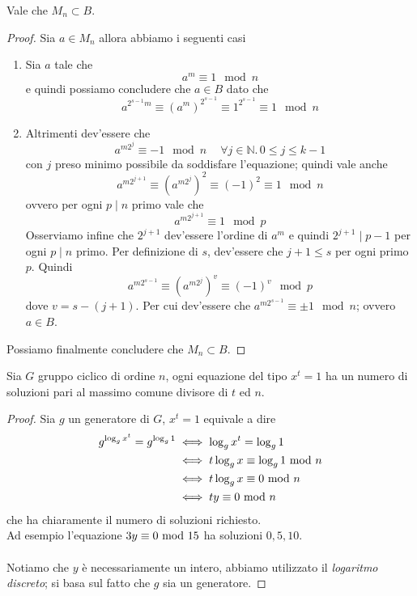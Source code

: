 \begin{lemma}
	Vale che $M_n\subset B$.
\end{lemma}
\begin{proof}
	Sia $a \in M_n$ allora abbiamo i seguenti casi
	\begin{enumerate}
		\item Sia $a$ tale che 
		\begin{equation*}
			a^m \equiv 1 \mod n 
		\end{equation*}
		e quindi possiamo concludere che $a \in B$ dato che 
		\begin{equation*}
			a^{2^{s-1}m} \equiv (a^m)^{2^{s-1}} \equiv 1^{2^{s-1}} \equiv 1 \mod n
		\end{equation*}
		\item Altrimenti dev'essere che
		\begin{equation*}
			a^{m2^{j}} \equiv -1 \mod n \quad\ \forall j \in \mathbb{N}.\, 0 \le j \le k-1
		\end{equation*} 
		con $j$ preso minimo possibile da soddisfare l'equazione; quindi vale anche
		\begin{equation*}
			a^{m2^{j+1}} \equiv (a^{m2^j})^2 \equiv (-1)^2 \equiv 1 \mod n
		\end{equation*}
		ovvero per ogni $p \mid n$ primo vale che 
		\begin{equation*}
			a^{m2^{j+1}} \equiv 1 \mod p
		\end{equation*}
		Osserviamo infine che $2^{j+1}$ dev'essere l'ordine di $a^m$ e quindi $2^{j+1} \mid p-1$ 
		per ogni $p \mid n$ primo. Per definizione di $s$, dev'essere che $j+1 \le s$ per ogni 
		primo $p$. Quindi
		\begin{equation*}
			a^{m2^{s-1}} \equiv (a^{m2^{j}})^v \equiv (-1)^v \mod p
		\end{equation*}
		dove $v = s - (j+1)$. Per cui dev'essere che $a^{m2^{s-1}} \equiv \pm 1 \mod n$; ovvero 
		$a \in B$.
	\end{enumerate}
	Possiamo finalmente concludere che $M_n \subset B$.
\end{proof}
\begin{lemma}
	Sia $G$ gruppo ciclico di ordine $n$, ogni equazione del tipo $x^t=1$ ha un numero di soluzioni pari al massimo comune divisore di $t$ ed $n$.
\end{lemma}
\begin{proof}
	Sia $g$ un generatore di $G$, $x^t=1$ equivale a dire 
	\begin{align*}
	g^{\log_gx^t}=g^{\log_g1}
	&\iff\log_gx^t=\log_g1\\
	&\iff t\log_gx\equiv\log_g1 \ \mathrm{mod}\ n\\
	&\iff t\log_gx\equiv0 \ \mathrm{mod}\ n\\
	&\iff ty\equiv0\ \mathrm{mod}\ n
	\end{align*}
	che ha chiaramente il numero di soluzioni richiesto. \\ Ad esempio l'equazione $3y\equiv0\ \mathrm{mod}\ 15$ ha soluzioni $0,5,10$. \\ \\ Notiamo che $y$ è necessariamente un intero, abbiamo utilizzato il \textit{logaritmo discreto}; si basa sul fatto che $g$ sia un generatore.
\end{proof}
